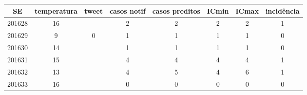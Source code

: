 \begin{tabular}{c|ccccccc}
  \hline
SE & temperatura & tweet & casos notif & casos preditos & ICmin & ICmax & incidência \\ 
  \hline
201628 & 16 &  & 2 & 2 & 2 & 2 & 1 \\ 
  201629 & 9 & 0 & 1 & 1 & 1 & 1 & 0 \\ 
  201630 & 14 &  & 1 & 1 & 1 & 1 & 0 \\ 
  201631 & 15 &  & 4 & 4 & 4 & 4 & 1 \\ 
  201632 & 13 &  & 4 & 5 & 4 & 6 & 1 \\ 
  201633 & 16 &  & 0 & 0 & 0 & 0 & 0 \\ 
   \hline
\end{tabular}
